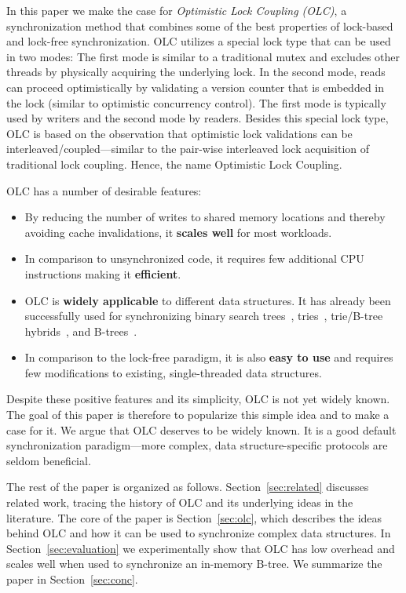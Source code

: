 \documentclass[11pt]{article}
\begin{document}
In this paper we make the case for {\em Optimistic Lock Coupling (OLC)}, a synchronization method that combines some of the best properties of lock-based and lock-free synchronization.
OLC utilizes a special lock type that can be used in two modes:
The first mode is similar to a traditional mutex and excludes other threads by physically acquiring the underlying lock.
In the second mode, reads can proceed optimistically by validating a version counter that is embedded in the lock (similar to optimistic concurrency control).
The first mode is typically used by writers and the second mode by readers.
Besides this special lock type, OLC is based on the observation that optimistic lock validations can be interleaved/coupled---similar to the pair-wise interleaved lock acquisition of traditional lock coupling.
Hence, the name Optimistic Lock Coupling.

OLC has a number of desirable features:
\begin{itemize}
\item By reducing the number of writes to shared memory locations and thereby avoiding cache invalidations, it {\bf scales well} for most workloads.
\item In comparison to unsynchronized code, it requires few additional CPU instructions making it {\bf efficient}.
\item OLC is {\bf widely applicable} to different data structures. It has already been successfully used for synchronizing binary search trees~\cite{DBLP:conf/ppopp/BronsonCCO10}, tries~\cite{artsync}, trie/B-tree hybrids~\cite{DBLP:dblp_conf/eurosys/MaoKM12}, and B-trees~\cite{buzzword}.
\item In comparison to the lock-free paradigm, it is also {\bf easy to use} and requires few modifications to existing, single-threaded data structures.
\end{itemize}
Despite these positive features and its simplicity, OLC is not yet widely known.
The goal of this paper is therefore to popularize this simple idea and to make a case for it.
We argue that OLC deserves to be widely known.
It is a good default synchronization paradigm---more complex, data structure-specific protocols are seldom beneficial.

The rest of the paper is organized as follows.
Section~\ref{sec:related} discusses related work, tracing the history of OLC and its underlying ideas in the literature.
The core of the paper is Section~\ref{sec:olc}, which describes the ideas behind OLC and how it can be used to synchronize complex data structures.
In Section~\ref{sec:evaluation} we experimentally show that OLC has low overhead and scales well when used to synchronize an in-memory B-tree.
We summarize the paper in Section~\ref{sec:conc}.
\end{document}
